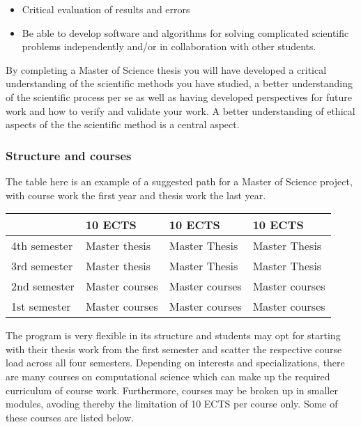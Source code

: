 \documentclass{beamer}
\begin{document}
\begin{frame}
\begin{block}{}
\begin{itemize}
\item Critical evaluation of results and errors

\item Be able to develop software and algorithms for solving complicated scientific problems independently and/or in collaboration with other students.
\end{itemize}

\noindent
By completing a Master of Science thesis you will have developed a critical understanding of the scientific methods you have studied, a better understanding of the scientific process per se as well as having developed perspectives for future work and how to verify and validate your work. A better understanding of ethical aspects of the the scientific method is a central aspect.
\end{block}
\end{frame}

\begin{frame}
\frametitle{Structure and courses}

\begin{block}{}
The table here is an example of a suggested path for a Master of Science project,
with course work the first year and thesis work the last year.


{\footnotesize
\begin{tabular}{llll}
\hline
\multicolumn{1}{l}{  } & \multicolumn{1}{l}{ 10 ECTS } & \multicolumn{1}{l}{ 10 ECTS } & \multicolumn{1}{l}{ 10 ECTS } \\
\hline
4th semester & Master thesis  & Master Thesis  & Master Thesis  \\
\hline
3rd semester & Master thesis  & Master Thesis  & Master Thesis  \\
\hline
2nd semester & Master courses & Master courses & Master courses \\
\hline
1st semester & Master courses & Master courses & Master courses \\
\hline
\end{tabular}
}

\noindent
The program is very flexible in its structure and students may opt for starting with their thesis
work from the first semester and scatter the respective course load across all four semesters.
Depending on interests and specializations, there are many courses on computational science which can make
up the required curriculum of course work. Furthermore, courses may be broken up in smaller modules,
avoding thereby the limitation of 10 ECTS per course only. Some of these courses are listed below.
\end{block}
\end{frame}
\end{document}
